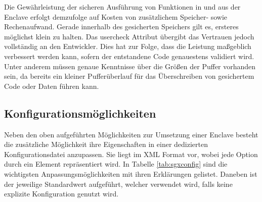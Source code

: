 Die Gewährleistung der sicheren Ausführung von Funktionen in und aus der Enclave erfolgt demzufolge auf Kosten von zusätzlichem Speicher- sowie Rechenaufwand. Gerade innerhalb des gesicherten Speichers gilt es, ersteres möglichst klein zu halten. Das user\textunderscore check Attribut übergibt das Vertrauen jedoch vollständig an den Entwickler. Dies hat zur Folge, dass die Leistung maßgeblich verbessert werden kann, sofern der entstandene Code genauestens validiert wird. Unter anderem müssen genaue Kenntnisse über die Größen der Puffer vorhanden sein, da bereits ein kleiner Pufferüberlauf für das Überschreiben von gesichertem Code oder Daten führen kann.


%	
%	

\subsection{Konfigurationsmöglichkeiten}

Neben den oben aufgeführten Möglichkeiten zur Umsetzung einer Enclave besteht die zusätzliche Möglichkeit ihre Eigenschaften in einer dedizierten Konfigurationsdatei anzupassen. Sie liegt im XML Format vor, wobei jede Option durch ein Element repräsentiert wird. In Tabelle \ref{tab:sgxconfig} sind die wichtigsten Anpassungsmöglichkeiten mit ihren Erklärungen gelistet. Daneben ist der jeweilige Standardwert aufgeführt, welcher verwendet wird, falls keine explizite Konfiguration genutzt wird.

